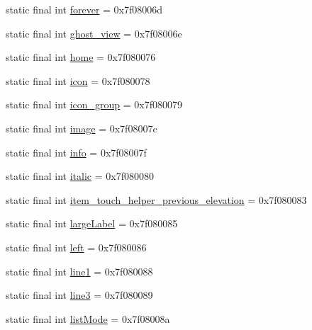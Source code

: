 \begin{DoxyCompactItemize}
static final int \mbox{\hyperlink{classandroid_1_1support_1_1design_1_1R_1_1id_a6ec90276f3cf057a0cabcd22b4b4eb6a}{forever}} = 0x7f08006d
\item 
static final int \mbox{\hyperlink{classandroid_1_1support_1_1design_1_1R_1_1id_a41295642e91c7262875f7914b5ce240e}{ghost\+\_\+view}} = 0x7f08006e
\item 
static final int \mbox{\hyperlink{classandroid_1_1support_1_1design_1_1R_1_1id_a848c27a28b62431c2fc8e4bb50cf204c}{home}} = 0x7f080076
\item 
static final int \mbox{\hyperlink{classandroid_1_1support_1_1design_1_1R_1_1id_a62494a5c59714ce0338e2e5c84665d65}{icon}} = 0x7f080078
\item 
static final int \mbox{\hyperlink{classandroid_1_1support_1_1design_1_1R_1_1id_a19ea57e4b9ba2101c5f99dee6763cdd0}{icon\+\_\+group}} = 0x7f080079
\item 
static final int \mbox{\hyperlink{classandroid_1_1support_1_1design_1_1R_1_1id_ae3ec7e2d3cf3a673e1479e9f39e25716}{image}} = 0x7f08007c
\item 
static final int \mbox{\hyperlink{classandroid_1_1support_1_1design_1_1R_1_1id_a835f9da94449c6b2e273b1da9a0bbd69}{info}} = 0x7f08007f
\item 
static final int \mbox{\hyperlink{classandroid_1_1support_1_1design_1_1R_1_1id_a3d66f561d244a5c64e8a7e8bc61a4e7a}{italic}} = 0x7f080080
\item 
static final int \mbox{\hyperlink{classandroid_1_1support_1_1design_1_1R_1_1id_ace7c90a7a591a13a8cc5e969c821e08d}{item\+\_\+touch\+\_\+helper\+\_\+previous\+\_\+elevation}} = 0x7f080083
\item 
static final int \mbox{\hyperlink{classandroid_1_1support_1_1design_1_1R_1_1id_afd366da5bef3835c481c8caeaae9f216}{large\+Label}} = 0x7f080085
\item 
static final int \mbox{\hyperlink{classandroid_1_1support_1_1design_1_1R_1_1id_a81624ba2a9b9f8858709fbac6452ce42}{left}} = 0x7f080086
\item 
static final int \mbox{\hyperlink{classandroid_1_1support_1_1design_1_1R_1_1id_a4ca979dfdfa159de3380dc7366d4475a}{line1}} = 0x7f080088
\item 
static final int \mbox{\hyperlink{classandroid_1_1support_1_1design_1_1R_1_1id_adb2c99c7cb5b12eb153c76aca66ae2c2}{line3}} = 0x7f080089
\item 
static final int \mbox{\hyperlink{classandroid_1_1support_1_1design_1_1R_1_1id_a7b5a48e1774d54084d1294b471209727}{list\+Mode}} = 0x7f08008a
\item 

\end{DoxyCompactItemize}
